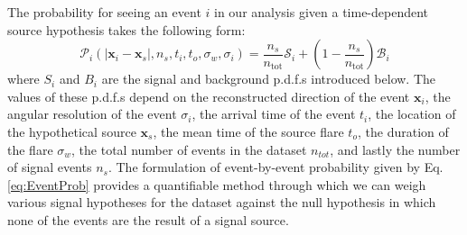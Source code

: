 \documentclass{gatech-thesis}
\begin{document}
The probability for seeing an event $i$ in our analysis given a time-dependent source hypothesis takes the following form:
\begin{equation}\label{eq:EventProb}
\mathcal{P}_i(|\mathbf{x}_i-\mathbf{x}_s|,n_s,t_i,t_o,\sigma_w,\sigma_i) = \frac{n_s}{n_{\mathrm{tot}}} \mathcal{S}_i + \left(1-\frac{n_s}{n_{\mathrm{tot}}}\right) \mathcal{B}_i
\end{equation}
where $S_i$ and $B_i$ are the signal and background p.d.f.s introduced below. The values of these p.d.f.s depend on the reconstructed direction of the event $\mathbf{x}_i$, the angular resolution of the event $\sigma_i$, the arrival time of the event $t_i$, the location of the hypothetical source $\mathbf{x}_s$, the mean time of the source flare $t_o$, the duration of the flare $\sigma_w$, the total number of events in the dataset $n_{tot}$, and lastly the number of signal events $n_s$. The formulation of event-by-event probability given by Eq. \ref{eq:EventProb} provides a quantifiable method through which we can weigh various signal hypotheses for the dataset against the null hypothesis in which none of the events are the result of a signal source.
\end{document}
